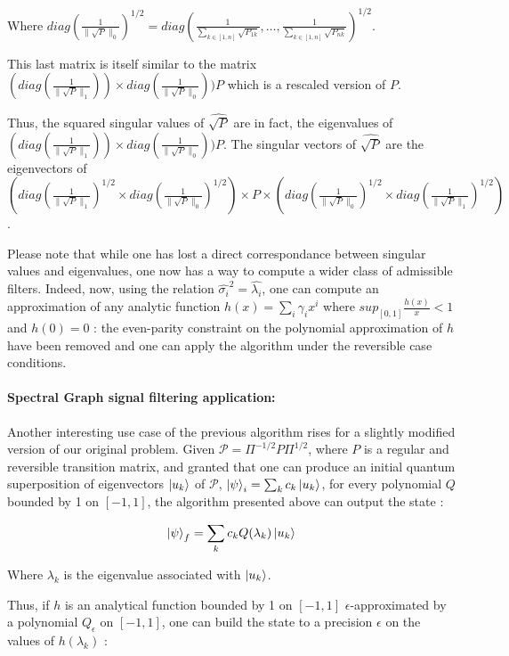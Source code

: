 \documentclass{article}
\begin{document}
Where $diag(\frac{1}{\|\sqrt{P}\|_0})^{1/2} = diag(\frac{1}{\sum_{k\in [1,n]} \sqrt{P_{1k}}}, \hdots, \frac{1}{\sum_{k\in [1,n]} \sqrt{P_{nk}}})^{1/2}$. 

This last matrix is itself similar to the matrix $(diag(\frac{1}{\|\sqrt{P}\|_1})) \times diag(\frac{1}{\|\sqrt{P}\|_0})) P$ which is a rescaled version of $P$.

Thus, the squared singular values of $\widehat{\sqrt{P}}$ are in fact, the eigenvalues of $(diag(\frac{1}{\|\sqrt{P}\|_1})) \times diag(\frac{1}{\|\sqrt{P}\|_0})) P$. The singular vectors of $\widehat{\sqrt{P}}$ are the eigenvectors of $(diag(\frac{1}{\|\sqrt{P}\|_1})^{1/2} \times diag(\frac{1}{\|\sqrt{P}\|_0})^{1/2}) \times P \times (diag(\frac{1}{\|\sqrt{P}\|_0})^{1/2} \times diag(\frac{1}{\|\sqrt{P}\|_1})^{1/2})$.

Please note that while one has lost a direct correspondance between singular values and eigenvalues, one now has a way to compute a wider class of admissible filters. Indeed, now, using the relation $\widehat{\sigma_i}^2 = \widehat{\lambda_i}$, one can compute an approximation of any analytic function $h(x)=\sum_i \gamma_i x^i$ where $sup_{[0,1]} \frac{h(x)}{x} < 1$ and $h(0)=0$ : the even-parity constraint on the polynomial approximation of $h$ have been removed and one can apply the algorithm under the reversible case conditions.

\paragraph{Spectral Graph signal filtering application:}
Another interesting use case of the previous algorithm rises for a slightly modified version of our original problem. Given $\mathcal{P} = \Pi^{-1/2} P \Pi^{1/2}$, where $P$ is a regular and reversible transition matrix, and granted that one can produce an initial quantum superposition of eigenvectors $\ket{u_k}$ of $\mathcal{P}$, $\ket{\psi}_i = \sum_k c_k \ket{u_k}$, for every polynomial $Q$ bounded by 1 on $[-1,1]$, the algorithm presented above can output the state :

\begin{equation}
    \ket{\psi}_f = \sum_k c_k Q(\lambda_k) \ket{u_k} 
\end{equation}
    
Where $\lambda_k$ is the eigenvalue associated with $\ket{u_k}$.

Thus, if $h$ is an analytical function bounded by 1 on $[-1,1]$ $\epsilon$-approximated by a polynomial $Q_\epsilon$ on $[-1,1]$, one can build the state to a precision $\epsilon$ on the values of $h(\lambda_k)$ :
\end{document}
